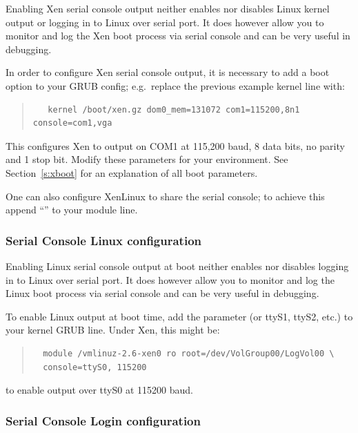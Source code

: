 \documentclass[11pt,twoside,final,openright]{report}
\begin{document}
Enabling Xen serial console output neither enables nor disables Linux
kernel output or logging in to Linux over serial port.  It does however
allow you to monitor and log the Xen boot process via serial console and
can be very useful in debugging.


In order to configure Xen serial console output, it is necessary to
add a boot option to your GRUB config; e.g.\ replace the previous
example kernel line with:
\begin{quote} {\small \begin{verbatim}
   kernel /boot/xen.gz dom0_mem=131072 com1=115200,8n1 console=com1,vga
\end{verbatim}}
\end{quote}

This configures Xen to output on COM1 at 115,200 baud, 8 data bits, no
parity and 1 stop bit. Modify these parameters for your environment.
See Section~\ref{s:xboot} for an explanation of all boot parameters.

One can also configure XenLinux to share the serial console; to achieve
this append ``'' to your module line.


\subsubsection{Serial Console Linux configuration}

Enabling Linux serial console output at boot neither enables nor
disables logging in to Linux over serial port.  It does however allow
you to monitor and log the Linux boot process via serial console and can be
very useful in debugging.

To enable Linux output at boot time, add the parameter
 (or ttyS1, ttyS2, etc.) to your kernel GRUB line.
Under Xen, this might be:
\begin{quote} 
{\footnotesize \begin{verbatim}
  module /vmlinuz-2.6-xen0 ro root=/dev/VolGroup00/LogVol00 \
  console=ttyS0, 115200
\end{verbatim}}
\end{quote}
to enable output over ttyS0 at 115200 baud.



\subsubsection{Serial Console Login configuration}
\end{document}
